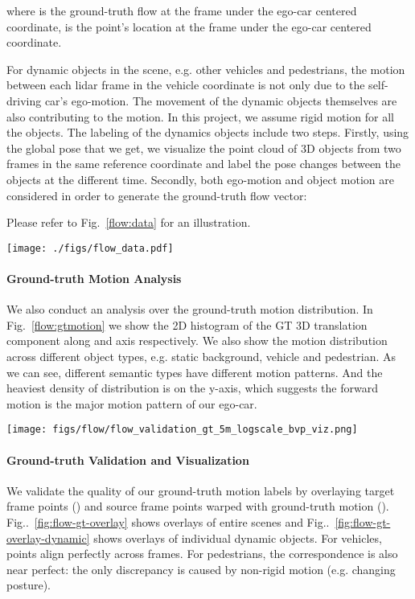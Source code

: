 \documentclass[10pt,twocolumn,letterpaper]{article}
\makeatletter
\def\@onedot{\ifx\@let@token.\else.\null\fi\xspace}
\DeclareRobustCommand\onedot{\futurelet\@let@token\@onedot}
\newcommand{\figref}[1]{Fig\onedot~\ref{#1}}
\makeatother
\begin{document}
where  is the ground-truth flow at the frame  under the ego-car centered coordinate,  is the point's location at the frame  under the ego-car centered coordinate.

For dynamic objects in the scene, e.g. other vehicles and pedestrians, the motion between each lidar frame in the vehicle coordinate is not only due to the self-driving car's ego-motion. The movement of the dynamic objects themselves are also contributing to the motion. In this project, we assume rigid motion for all the objects. The labeling of the dynamics objects include two steps. Firstly, using the global pose that we get, we visualize the point cloud of 3D objects from two frames in the same reference coordinate and label the pose changes  between the objects at the different time. Secondly, both ego-motion and object motion are considered in order to generate the ground-truth flow vector:

Please refer to Fig.~\ref{flow:data} for an illustration. 
\begin{figure*}
\centering
\texttt{[image: ./figs/flow\_data.pdf]} 
\caption{Flow data generation. The source of motion comes from two components: motion of the ego-car and motion of the dynamic objects. } \label{flow:data}
\end{figure*}

\paragraph{Ground-truth Motion Analysis} We also conduct an analysis over the ground-truth motion distribution. In Fig.~\ref{flow:gtmotion} we show the 2D histogram of the GT 3D translation component along  and  axis respectively. We also show the motion distribution across different object types, e.g. static background, vehicle and pedestrian. As we can see, different semantic types have different motion patterns. And the heaviest density of distribution is on the y-axis, which suggests the forward motion is the major motion pattern of our ego-car. 
\begin{figure*}
\centering
\texttt{[image: figs/flow/flow\_validation\_gt\_5m\_logscale\_bvp\_viz.png]} 
\caption{Ground-truth Motion Distribution of the Lidar Flow Dataset (unit in meters)} \label{flow:gtmotion}
\end{figure*}

\paragraph{Ground-truth Validation and Visualization} 
We validate the quality of our ground-truth motion labels by overlaying target frame points () and source frame points warped with ground-truth motion (). \figref{fig:flow-gt-overlay} shows overlays of entire scenes and \figref{fig:flow-gt-overlay-dynamic} shows overlays of individual dynamic objects. For vehicles, points align perfectly across frames. For pedestrians, the correspondence is also near perfect: the only discrepancy is caused by non-rigid motion (e.g. changing posture).
\end{document}
